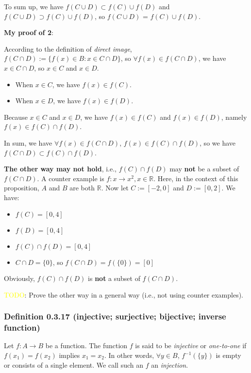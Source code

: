 \documentclass[12pt, letterpaper, oneside]{book}
\begin{document}
To sum up, we have $f(C \cup D) \subset f(C) \cup f(D)$ and $f(C \cup D)
\supset f(C) \cup f(D)$, so $f(C \cup D)$ = $f(C) \cup f(D)$.

\textbf{My proof of 2}:

According to the definition of \textit{direct image}, $f(C \cap D) := \{f(x)
\in B: x \in C \cap D\}$, so $\forall f(x) \in f(C \cap D)$, we have $x \in C
\cap D$, so $x \in C$ and $x \in D$.

\begin{itemize}
  \item When $x \in C$, we have $f(x) \in f(C)$.
  \item When $x \in D$, we have $f(x) \in f(D)$.
\end{itemize}

Because $x \in C$ and $x \in D$, we have $f(x) \in f(C)$ and $f(x) \in f(D)$,
namely $f(x) \in f(C) \cap f(D)$.

In sum, we have $\forall f(x) \in f(C \cap D)$, $f(x) \in f(C) \cap f(D)$, so
we have $f(C \cap D) \subset f(C) \cap f(D)$.

\textbf{The other way may not hold}, i.e., $f(C) \cap f(D)$ may \textbf{not} be
a subset of $f(C \cap D)$. A counter example is $f: x \rightarrow x^2, x \in
\mathbb{R}$. Here, in the context of this proposition, $A$ and $B$ are both
$\mathbb{R}$. Now let $C := [-2, 0]$ and $D := [0, 2]$. We have:

\begin{itemize}
  \item $f(C) = [0, 4]$
  \item $f(D) = [0, 4]$
  \item $f(C) \cap f(D) = [0, 4]$
  \item $C \cap D = \{0\}$, so $f(C \cap D) = f(\{0\}) = [0]$
\end{itemize}

Obviously, $f(C) \cap f(D)$ is \textbf{not} a subset of $f(C \cap D)$.

\colorbox{red!100}{\textcolor{yellow}{TODO}}: Prove the other way in a general
way (i.e., not using counter examples).

\subsubsection*{
  Definition 0.3.17 (injective; surjective; bijective; inverse function)
}

Let $f: A \rightarrow B$ be a function. The function $f$ is said to be
\textit{injective} or \textit{one-to-one} if $f(x_1) = f(x_2)$ implies $x_1 =
x_2$. In other words, $\forall y \in B$, $f^{-1}(\{y\})$ is empty or consists
of a single element. We call such an $f$ an \textit{injection}.
\end{document}
